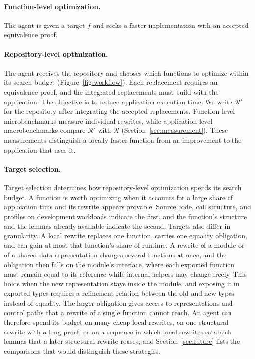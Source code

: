 \documentclass{article}
\begin{document}
\paragraph{Function-level optimization.}
The agent is given a target $f$ and seeks a faster implementation with an accepted equivalence proof.

\paragraph{Repository-level optimization.}
The agent receives the repository and chooses which functions to optimize within its search budget (Figure~\ref{fig:workflow}).
Each replacement requires an equivalence proof, and the integrated replacements must build with the application.
The objective is to reduce application execution time.
We write $\mathcal{R}'$ for the repository after integrating the accepted replacements.
Function-level microbenchmarks measure individual rewrites, while application-level macrobenchmarks compare $\mathcal{R}'$ with $\mathcal{R}$ (Section~\ref{sec:measurement}).
These measurements distinguish a locally faster function from an improvement to the application that uses it.

\paragraph{Target selection.}
Target selection determines how repository-level optimization spends its search budget.
A function is worth optimizing when it accounts for a large share of application time and its rewrite appears provable.
Source code, call structure, and profiles on development workloads indicate the first, and the function's structure and the lemmas already available indicate the second.
Targets also differ in granularity.
A local rewrite replaces one function, carries one equality obligation, and can gain at most that function's share of runtime.
A rewrite of a module or of a shared data representation changes several functions at once, and the obligation then falls on the module's interface, where each exported function must remain equal to its reference while internal helpers may change freely.
This holds when the new representation stays inside the module, and exposing it in exported types requires a refinement relation between the old and new types instead of equality.
The larger obligation gives access to representations and control paths that a rewrite of a single function cannot reach.
An agent can therefore spend its budget on many cheap local rewrites, on one structural rewrite with a long proof, or on a sequence in which local rewrites establish lemmas that a later structural rewrite reuses, and Section~\ref{sec:future} lists the comparisons that would distinguish these strategies.
\end{document}
